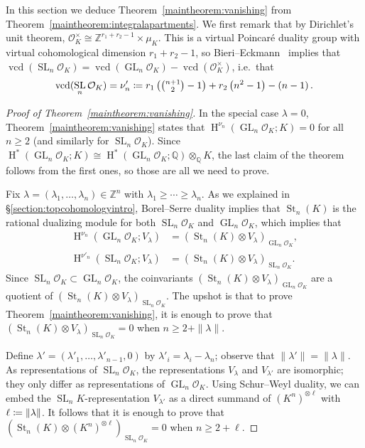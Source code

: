 \documentclass[11 pt]{article}
\theoremstyle{plain}
\theoremstyle{definition}
\numberwithin{equation}{section}
\DeclareMathOperator{\GL}{GL}
\DeclareMathOperator{\SL}{SL}
\newcommand\Z{\ensuremath{\mathbb{Z}}}
\newcommand\Q{\ensuremath{\mathbb{Q}}}
\DeclareMathOperator{\HH}{H}
\renewcommand{\O}{\mathcal{O}}
\DeclareMathOperator{\vcd}{vcd}
\DeclareMathOperator{\St}{St}
\newcommand\coloneq{\mathrel{\mathop:}\mkern-1.2mu=}
\newcommand\tensor{\otimes}
\newcommand\iso{\cong}
\newcommand\GLvcd{\nu_n}
\newcommand\SLvcd{\nu'_n}
\begin{document}
In this section we deduce Theorem~\ref{maintheorem:vanishing}  from  Theorem~\ref{maintheorem:integralapartments}.  We first remark that by Dirichlet's unit theorem, $\O_K^\times\iso \Z^{r_1+r_2-1}\times \mu_K$.  This is a virtual Poincar\'{e} duality group 
with virtual cohomological dimension $r_1+r_2-1$, so Bieri--Eckmann~\cite[Theorem~3.5]{BieriEckmannDuality} implies that $\vcd(\SL_n \O_K)=\vcd(\GL_n \O_K)-\vcd(\O_K^\times)$, i.e.\ that
\[\vcd(\SL_n \O_K) =\SLvcd\coloneq {\textstyle r_1\left(\binom{n+1}{2}-1\right)} + r_2\left(n^2-1\right) - \left(n-1\right).\]
\begin{proof}[Proof of Theorem~\ref{maintheorem:vanishing}]
In the special case $\lambda=0$, Theorem~\ref{maintheorem:vanishing}  states that $\HH^{\GLvcd}(\GL_n \O_K;K) = 0$ for all $n\geq 2$ (and similarly for $\SL_n\O_K$). Since $\HH^{\ast}(\GL_n \O_K;K)\iso\HH^{\ast}(\GL_n \O_K;\Q)\tensor_\Q K$, the last claim of the theorem follows from the first ones, so those are all we need to prove.

Fix $\lambda = (\lambda_1,\ldots,\lambda_n)\in \Z^n$ with $\lambda_1\geq \cdots\geq \lambda_n$.
As we explained in \S\ref{section:topcohomologyintro}, Borel--Serre duality implies that $\St_n(K)$ is the rational dualizing module for both $\SL_n\O_K$ and $\GL_n\O_K$, which implies that
\begin{align*}
\HH^{\GLvcd}(\GL_n \O_K;V_{\lambda}) &= (\St_n(K) \otimes V_{\lambda})_{\GL_n \O_K},\\
\HH^{\SLvcd}(\SL_n \O_K;V_{\lambda}) &= (\St_n(K) \otimes V_{\lambda})_{\SL_n \O_K}.
\end{align*}
Since $\SL_n \O_K \subset \GL_n \O_K$, the coinvariants $(\St_n(K) \otimes V_{\lambda})_{\GL_n \O_K}$ are a quotient of $(\St_n(K) \otimes V_{\lambda})_{\SL_n \O_K}$.
The upshot is that to prove Theorem~\ref{maintheorem:vanishing}, it is enough to prove
that $(\St_n(K) \otimes V_{\lambda})_{\SL_n \O_K} = 0$ when $n\geq 2+\|\lambda\|$.

Define $\lambda' = (\lambda'_1,\ldots,\lambda'_{n-1},0)$ by $\lambda'_i = \lambda_i - \lambda_n$; observe that
$\|\lambda'\|=\|\lambda\|$.
As representations of $\SL_n \O_K$, the representations $V_{\lambda}$ and
$V_{\lambda'}$ are isomorphic; they only differ as representations of $\GL_n \O_K$.
Using Schur--Weyl duality, we can embed the $\SL_n K$-representation
$V_{\lambda'}$ as a direct summand of $(K^n)^{\otimes \ell}$ with $\ell \coloneq \|\lambda\|$.
It follows that it is enough to prove that
$(\St_n(K) \otimes (K^n)^{\otimes \ell})_{\SL_n \O_K} = 0$ when $n \geq 2+\ell$.


\end{proof}
\end{document}
